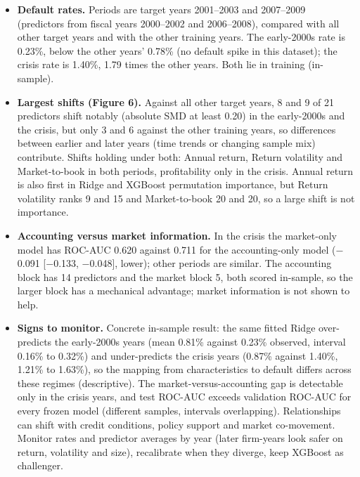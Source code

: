 \documentclass[9pt,letterpaper]{extarticle}
\begin{document}
\begin{itemize}
  \item \textbf{Default rates.} Periods are target years 2001--2003 and 2007--2009 (predictors from fiscal years 2000--2002 and 2006--2008), compared with all other target years and with the other training years. The early-2000s rate is 0.23\%, below the other years' 0.78\% (no default spike in this dataset); the crisis rate is 1.40\%, 1.79 times the other years. Both lie in training (in-sample).
  \item \textbf{Largest shifts (Figure 6).} Against all other target years, 8 and 9 of 21 predictors shift notably (absolute SMD at least 0.20) in the early-2000s and the crisis, but only 3 and 6 against the other training years, so differences between earlier and later years (time trends or changing sample mix) contribute. Shifts holding under both: Annual return, Return volatility and Market-to-book in both periods, profitability only in the crisis. Annual return is also first in Ridge and XGBoost permutation importance, but Return volatility ranks 9 and 15 and Market-to-book 20 and 20, so a large shift is not importance.
  \item \textbf{Accounting versus market information.} In the crisis the market-only model has ROC-AUC 0.620 against 0.711 for the accounting-only model ($-$0.091 [$-$0.133, $-$0.048], lower); other periods are similar. The accounting block has 14 predictors and the market block 5, both scored in-sample, so the larger block has a mechanical advantage; market information is not shown to help.
  \item \textbf{Signs to monitor.} Concrete in-sample result: the same fitted Ridge over-predicts the early-2000s years (mean 0.81\% against 0.23\% observed, interval 0.16\% to 0.32\%) and under-predicts the crisis years (0.87\% against 1.40\%, 1.21\% to 1.63\%), so the mapping from characteristics to default differs across these regimes (descriptive). The market-versus-accounting gap is detectable only in the crisis years, and test ROC-AUC exceeds validation ROC-AUC for every frozen model (different samples, intervals overlapping). Relationships can shift with credit conditions, policy support and market co-movement. Monitor rates and predictor averages by year (later firm-years look safer on return, volatility and size), recalibrate when they diverge, keep XGBoost as challenger.
\end{itemize}
\end{document}
